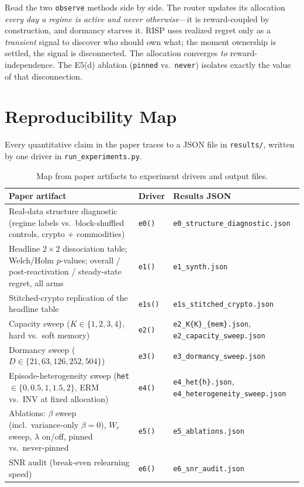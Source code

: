 \begin{intuition}
Read the two \texttt{observe} methods side by side. The router updates its
allocation \emph{every day a regime is active and never otherwise}---it is
reward-coupled by construction, and dormancy starves it. RISP uses
realized regret only as a \emph{transient} signal to discover who should own
what; the moment ownership is settled, the signal is disconnected. The
allocation converges \emph{to} reward-independence. The E5(d) ablation
(\texttt{pinned} vs.\ \texttt{never}) isolates exactly the value of that
disconnection.
\end{intuition}


\section{Reproducibility Map}
\label{sec:dd6-repro}

Every quantitative claim in the paper traces to a JSON file in
\texttt{results/}, written by one driver in \texttt{run\_experiments.py}.

\begin{table}[h]
\centering
\small
\begin{tabular}{p{4.6cm} l l}
\hline
\textbf{Paper artifact} & \textbf{Driver} & \textbf{Results JSON} \\
\hline
Real-data structure diagnostic (regime labels vs.\ block-shuffled controls,
crypto + commodities) & \texttt{e0()} & \texttt{e0\_structure\_diagnostic.json} \\
Headline $2{\times}2$ dissociation table; Welch/Holm $p$-values; overall /
post-reactivation / steady-state regret, all arms & \texttt{e1()} &
\texttt{e1\_synth.json} \\
Stitched-crypto replication of the headline table & \texttt{e1s()} &
\texttt{e1s\_stitched\_crypto.json} \\
Capacity sweep ($K \in \{1,2,3,4\}$, hard vs.\ soft memory) & \texttt{e2()}
& \texttt{e2\_K\{K\}\_\{mem\}.json}, \texttt{e2\_capacity\_sweep.json} \\
Dormancy sweep ($D \in \{21, 63, 126, 252, 504\}$) & \texttt{e3()} &
\texttt{e3\_dormancy\_sweep.json} \\
Episode-heterogeneity sweep (\texttt{het} $\in \{0, 0.5, 1, 1.5, 2\}$, ERM
vs.\ INV at fixed allocation) & \texttt{e4()} &
\texttt{e4\_het\{h\}.json}, \texttt{e4\_heterogeneity\_sweep.json} \\
Ablations: $\beta$ sweep (incl.\ variance-only $\beta{=}0$), $W_c$ sweep,
$\lambda$ on/off, pinned vs.\ never-pinned & \texttt{e5()} &
\texttt{e5\_ablations.json} \\
SNR audit (break-even relearning speed) & \texttt{e6()} &
\texttt{e6\_snr\_audit.json} \\
\hline
\end{tabular}
\caption{Map from paper artifacts to experiment drivers and output files.}
\label{tab:dd6-repromap}
\end{table}

